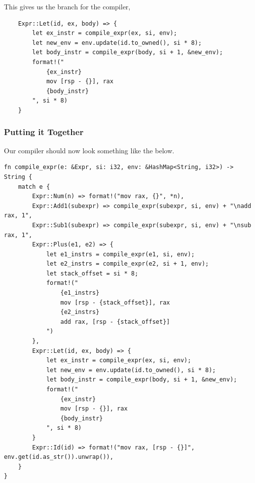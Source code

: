 \documentclass[letterpaper]{article}
\begin{document}
This gives us the branch for the compiler,
\begin{verbatim}
    Expr::Let(id, ex, body) => {
        let ex_instr = compile_expr(ex, si, env);
        let new_env = env.update(id.to_owned(), si * 8);
        let body_instr = compile_expr(body, si + 1, &new_env);
        format!("
            {ex_instr}
            mov [rsp - {}], rax
            {body_instr}
        ", si * 8)
    }
\end{verbatim}

\subsubsection{Putting it Together}
Our compiler should now look something like the below.
\begin{verbatim}
fn compile_expr(e: &Expr, si: i32, env: &HashMap<String, i32>) -> String {
    match e {
        Expr::Num(n) => format!("mov rax, {}", *n),
        Expr::Add1(subexpr) => compile_expr(subexpr, si, env) + "\nadd rax, 1",
        Expr::Sub1(subexpr) => compile_expr(subexpr, si, env) + "\nsub rax, 1",
        Expr::Plus(e1, e2) => {
            let e1_instrs = compile_expr(e1, si, env);
            let e2_instrs = compile_expr(e2, si + 1, env);
            let stack_offset = si * 8;
            format!("
                {e1_instrs}
                mov [rsp - {stack_offset}], rax
                {e2_instrs}
                add rax, [rsp - {stack_offset}]
            ")
        },
        Expr::Let(id, ex, body) => {
            let ex_instr = compile_expr(ex, si, env);
            let new_env = env.update(id.to_owned(), si * 8);
            let body_instr = compile_expr(body, si + 1, &new_env);
            format!("
                {ex_instr}
                mov [rsp - {}], rax
                {body_instr}
            ", si * 8)
        }
        Expr::Id(id) => format!("mov rax, [rsp - {}]", env.get(id.as_str()).unwrap()),
    }
}
\end{verbatim}
\end{document}
